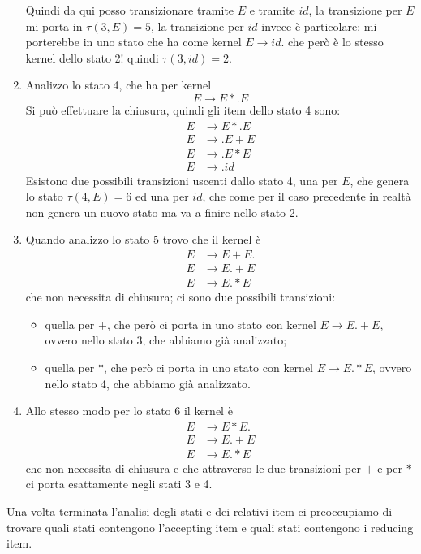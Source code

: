 \documentclass[class=book, crop=false, oneside, 12pt]{standalone}
\begin{document}
\begin{enumerate}
    Quindi da qui posso transizionare tramite \(E\) e tramite \(id\), la transizione per \(E\) mi porta in \(\tau(3,E)=5\), la transizione per \(id\) invece è particolare: mi porterebbe in uno stato che ha come kernel \(E \to id.\) che però è  lo stesso kernel dello stato 2! quindi \(\tau(3,id)=2\).
    \item Analizzo lo stato 4, che ha per kernel
    \begin{equation*}
        E \to E*.E 
    \end{equation*}
    Si può effettuare la chiusura, quindi gli item dello stato 4 sono:
    \begin{align*}
        E &\to E*.E \\ 
        E &\to .E+E \\
        E &\to .E*E \\
        E &\to .id
    \end{align*}
    Esistono due possibili transizioni uscenti dallo stato 4, una per \(E\), che genera lo stato \(\tau(4,E)=6\) ed una per \(id\), che come per il caso precedente in realtà non genera un nuovo stato ma va a finire nello stato 2.
    \item Quando analizzo lo stato 5 trovo che il kernel è
    \begin{align*}
        E &\to E+E. \\
        E &\to E.+E \\
        E &\to E.*E
    \end{align*}
    che non necessita di chiusura; ci sono due possibili transizioni:
    \begin{itemize}
        \item quella per \(+\), che però ci porta in uno stato con kernel \({E \to E.+E}\), ovvero nello stato 3, che abbiamo già analizzato;
        \item quella per \(*\), che però ci porta in uno stato con kernel \({E \to E.*E}\), ovvero nello stato 4, che abbiamo già analizzato.
    \end{itemize}
    \item Allo stesso modo per lo stato 6 il kernel è
    \begin{align*}
        E &\to E*E. \\
        E &\to E.+E \\
        E &\to E.*E
    \end{align*}
    che non necessita di chiusura e che attraverso le due transizioni per \(+\) e per \(*\) ci porta esattamente negli stati 3 e 4.
\end{enumerate}
Una volta terminata l'analisi degli stati e dei relativi item ci preoccupiamo di trovare quali stati contengono l'accepting item e quali stati contengono i reducing item.
\end{document}
